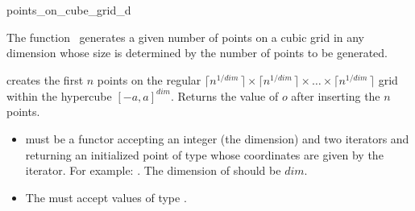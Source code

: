 \begin{ccRefFunction}{points_on_cube_grid_d}

\ccDefinition

The function \ccRefName\ generates a given number of points on a cubic
grid in any dimension 
whose size is determined by the number of points to be generated.


\def\ccLongParamLayout{\ccTrue}
{ creates the first $n$ points on the regular $\lceil n^{1/dim}\,\rceil
    \times \lceil  n^{1/dim}\,\rceil\times \ldots \times \lceil  n^{1/dim}\,\rceil$ 
    grid within the hypercube
    $[-a,a]^{dim}$. Returns the value of $o$ after 
    inserting the $n$ points. 
}
\def\ccLongParamLayout{\ccFalse}

\ccRequirements
\begin{itemize}
    \item {} must be a functor accepting an integer (the dimension)
          and  two iterators and returning an initialized 
           point  of type  whose coordinates are given by the iterator.
 For example: 
  .
  The dimension of  should be $dim$.
   \item The  must accept values of type . 
\end{itemize}

 \\
 \\



\end{ccRefFunction}
